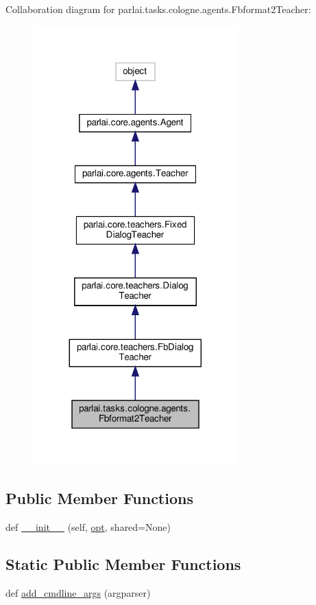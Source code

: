 Collaboration diagram for parlai.\+tasks.\+cologne.\+agents.\+Fbformat2\+Teacher\+:
\nopagebreak
\begin{figure}[H]
\begin{center}
\leavevmode
\includegraphics[width=224pt]{classparlai_1_1tasks_1_1cologne_1_1agents_1_1Fbformat2Teacher__coll__graph}
\end{center}
\end{figure}
\subsection*{Public Member Functions}
\begin{DoxyCompactItemize}
\item 
def \hyperlink{classparlai_1_1tasks_1_1cologne_1_1agents_1_1Fbformat2Teacher_ab0361ba169bc4a455265fd114358f237}{\+\_\+\+\_\+init\+\_\+\+\_\+} (self, \hyperlink{classparlai_1_1core_1_1teachers_1_1FbDialogTeacher_af7a9ec497b9cd0292d7b8fa220da7c28}{opt}, shared=None)
\end{DoxyCompactItemize}
\subsection*{Static Public Member Functions}
\begin{DoxyCompactItemize}
\item 
def \hyperlink{classparlai_1_1tasks_1_1cologne_1_1agents_1_1Fbformat2Teacher_a24dad9673eefe3890899cc9e5834c2c9}{add\+\_\+cmdline\+\_\+args} (argparser)
\end{DoxyCompactItemize}
